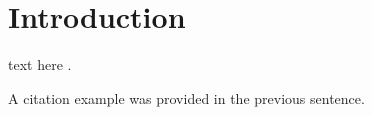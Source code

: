 \documentclass[journal,twocolumn,letterpaper]{IEEEJERM}
\begin{document}
\section{Introduction}
% 
% 
% 
% 
 text here \cite{clinical_electrocardiography}.

A citation example was provided in the previous sentence. 
\vspace*{1 cm}

%
%

\end{document}
